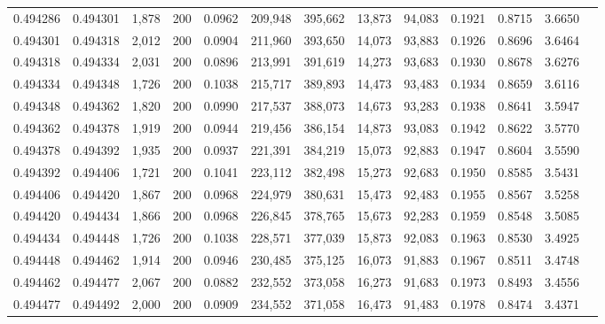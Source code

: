 \begin{tabular}{rrrrrrrrrrrrr}
0.494286 & 0.494301 & 1,878 & 200 &                                     0.0962 & 209,948 & 395,662 &  13,873 &  94,083 & 0.1921 & 0.8715 & 3.6650 \\
0.494301 & 0.494318 & 2,012 & 200 &                                     0.0904 & 211,960 & 393,650 &  14,073 &  93,883 & 0.1926 & 0.8696 & 3.6464 \\
0.494318 & 0.494334 & 2,031 & 200 &                                     0.0896 & 213,991 & 391,619 &  14,273 &  93,683 & 0.1930 & 0.8678 & 3.6276 \\
0.494334 & 0.494348 & 1,726 & 200 &                                     0.1038 & 215,717 & 389,893 &  14,473 &  93,483 & 0.1934 & 0.8659 & 3.6116 \\
0.494348 & 0.494362 & 1,820 & 200 &                                     0.0990 & 217,537 & 388,073 &  14,673 &  93,283 & 0.1938 & 0.8641 & 3.5947 \\
0.494362 & 0.494378 & 1,919 & 200 &                                     0.0944 & 219,456 & 386,154 &  14,873 &  93,083 & 0.1942 & 0.8622 & 3.5770 \\
0.494378 & 0.494392 & 1,935 & 200 &                                     0.0937 & 221,391 & 384,219 &  15,073 &  92,883 & 0.1947 & 0.8604 & 3.5590 \\
0.494392 & 0.494406 & 1,721 & 200 &                                     0.1041 & 223,112 & 382,498 &  15,273 &  92,683 & 0.1950 & 0.8585 & 3.5431 \\
0.494406 & 0.494420 & 1,867 & 200 &                                     0.0968 & 224,979 & 380,631 &  15,473 &  92,483 & 0.1955 & 0.8567 & 3.5258 \\
0.494420 & 0.494434 & 1,866 & 200 &                                     0.0968 & 226,845 & 378,765 &  15,673 &  92,283 & 0.1959 & 0.8548 & 3.5085 \\
0.494434 & 0.494448 & 1,726 & 200 &                                     0.1038 & 228,571 & 377,039 &  15,873 &  92,083 & 0.1963 & 0.8530 & 3.4925 \\
0.494448 & 0.494462 & 1,914 & 200 &                                     0.0946 & 230,485 & 375,125 &  16,073 &  91,883 & 0.1967 & 0.8511 & 3.4748 \\
0.494462 & 0.494477 & 2,067 & 200 &                                     0.0882 & 232,552 & 373,058 &  16,273 &  91,683 & 0.1973 & 0.8493 & 3.4556 \\
0.494477 & 0.494492 & 2,000 & 200 &                                     0.0909 & 234,552 & 371,058 &  16,473 &  91,483 & 0.1978 & 0.8474 & 3.4371 \\

\end{tabular}
